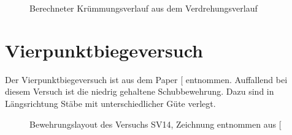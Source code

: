 \documentclass[
  11pt,
  letterpaper,
]{scrreprt}
\begin{document}
\begin{figure}[H]


\caption{\label{fig-chi-max-a3v2}Berechneter Krümmungsverlauf aus dem
Verdrehungsverlauf}

\end{figure}%

\newpage{}

\section{Vierpunktbiegeversuch}\label{vierpunktbiegeversuch}

Der Vierpunktbiegeversuch ist aus dem Paper
{[}\citeproc{ref-tue_einfluss_2019}{3}{]} entnommen. Auffallend bei
diesem Versuch ist die niedrig gehaltene Schubbewehrung. Dazu sind in
Längsrichtung Stäbe mit unterschiedlicher Güte verlegt.

\begin{figure}[H]


\caption{\label{fig-versuchsskizze-SV14}Bewehrungslayout des Versuchs
SV14, Zeichnung entnommen aus {[}\citeproc{ref-gitz_ansatze_2024}{1}{]}}

\end{figure}%
\end{document}
